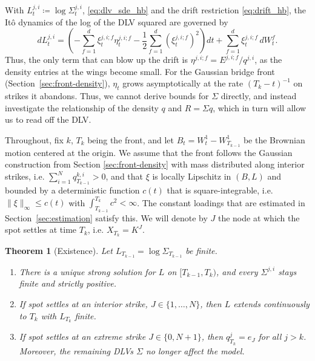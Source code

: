 \documentclass[11pt]{article}
\theoremstyle{plain}
\newtheorem{theorem}{Theorem}[section]
\theoremstyle{definition}
\theoremstyle{remark}
\begin{document}
With $L_t^{j,i}\coloneqq\log\Sigma_t^{j,i}$, \eqref{eq:dlv_sde_hb} and the drift restriction \eqref{eq:drift_hb}, the Itô dynamics of the log of the DLV squared are governed by 
\begin{equation}
  \label{eq:log_dlv_sde_mw}
  dL_t^{j,i}=\left(-\sum_{f=1}^d\xi_t^{j,i;f}\eta_t^{j,i;f}
    -\frac12\sum_{f=1}^d(\xi_t^{j,i;f})^2\right)dt+\sum_{f=1}^d\xi_t^{j,i;f}\,dW_t^f .
\end{equation}
Thus, the only term that can blow up the drift is $\eta^{j, i; f} = E^{j, i; f} / q^{j, i}$, as the density entries at the wings become small. 
For the Gaussian bridge front (Section~\ref{sec:front-density}), $\eta_t$ grows asymptotically at the rate $(T_k - t)^{-1}$ on strikes it abandons. 
Thus, we cannot derive bounds for $\Sigma$ directly, and instead investigate the relationship of the density $q$ and $R = \Sigma q$, which in turn will allow us to read off the DLV. 

Throughout, fix $k$, $T_k$ being the front, and let $B_t = W_t^1 - W_{T_{k-1}}^1$ be the Brownian motion centered at the origin. We assume that the front follows the Gaussian construction from Section \ref{sec:front-density} with mass distributed along interior strikes, i.e. $\sum_{i=1}^N q_{T_{k-1}}^{k, i} > 0$, and that $\xi$ is locally Lipschitz in $(B, L)$ and bounded by a deterministic function $c(t)$ that is square-integrable, i.e. $\|\xi \|_\infty \leq c(t)$ with $\int_{T_{k-1}}^{T_k}c^2<\infty$. The constant loadings that are estimated in Section~\ref{sec:estimation} satisfy this. We will denote by $J$ the node at which the spot settles at time $T_k$, i.e. $X_{T_k} = K^J$. 

\begin{theorem}[Existence]
\label{thm:existence_bh}
Let $L_{T_{k-1}} = \log \Sigma_{T_{k-1}} $ be finite.
\begin{enumerate}[label=(\roman*)]
  \item There is a unique strong solution for $L$ on $[T_{k-1},T_k)$, and every $\Sigma^{j,i}$ stays
    finite and strictly positive.
  \item If spot settles at an interior strike, $ J \in \lbrace 1, \dots, N \rbrace $, then $L$ extends continuously to $T_k$
    with $L_{T_k}$ finite.
  \item If spot settles at an extreme strike $ J \in \lbrace 0, N +1 \rbrace$, then $q^j_{T_k} = e_J$ for all $j > k$. Moreover, the remaining DLVs $\Sigma$ no longer affect the model. 
\end{enumerate}
\end{theorem}
\end{document}
